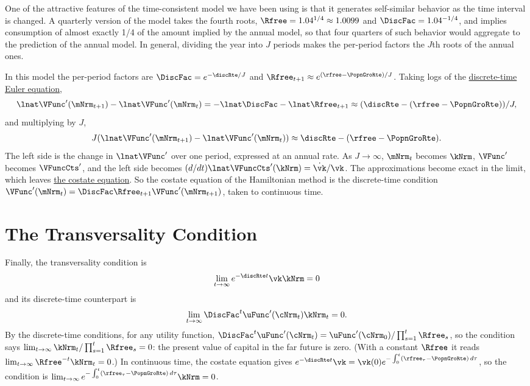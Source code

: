\documentclass{econark}
\begin{document}
One of the attractive features of the time-consistent model we have
been using is that it generates self-similar behavior as the time interval is
changed. A quarterly version of the model takes the fourth roots, $\Rfree=1.04^{1/4} \approx 1.0099$ and $\DiscFac=1.04^{-1/4}$, and implies
consumption of almost exactly 1/4 of the amount implied by the annual
model, so that four quarters of such behavior would aggregate to the
prediction of the annual model. In general, dividing the year into $J$ periods makes the per-period factors the $J$th roots of the annual ones.

In this model the per-period factors are $\DiscFac = e^{-\discRte/J}$ and $\Rfree_{t+1} \approx e^{(\rfree-\PopnGroRte)/J}$. Taking logs of the \hyperref[eq:HVD-discEuler]{discrete-time Euler equation},
\begin{equation*}
  \lnat \VFunc^{\prime}(\mNrm_{t+1}) - \lnat \VFunc^{\prime}(\mNrm_{t}) = -\lnat \DiscFac - \lnat \Rfree_{t+1} \approx (\discRte-(\rfree-\PopnGroRte))/J,
\end{equation*}
and multiplying by $J$,
\begin{equation}
  J(\lnat \VFunc^{\prime}(\mNrm_{t+1}) - \lnat \VFunc^{\prime}(\mNrm_{t})) \approx \discRte-(\rfree-\PopnGroRte) . \label{eq:vpk}
\end{equation}
The left side is the change in $\lnat \VFunc^{\prime}$ over one period, expressed at an annual rate. As $J \rightarrow \infty$, $\mNrm_{t}$ becomes $\kNrm$, $\VFunc^{\prime}$ becomes $\VFuncCts'$, and the left side becomes $(d/dt)\lnat \VFuncCts'(\kNrm) = \dot{\vk}/\vk$. The approximations become exact in the limit, which leaves \hyperref[eq:lamgrow]{the costate equation}. So the costate equation of the Hamiltonian method is the discrete-time condition $\VFunc^{\prime}(\mNrm_{t})=\DiscFac\Rfree_{t+1}\VFunc^{\prime}(\mNrm_{t+1})$, taken to continuous time.

\section{The Transversality Condition}

Finally, the transversality condition is
\begin{equation*}
  \lim_{t \rightarrow \infty} e^{-\discRte t} \vk \kNrm = 0
\end{equation*}
and its discrete-time counterpart is
\begin{equation}
  \lim_{t \rightarrow \infty} \DiscFac^{t} \uFunc^{\prime}(\cNrm_{t}) \kNrm_{t} = 0. \label{eq:HVD-discTVC}
\end{equation}
By the discrete-time conditions, for any utility function, $\DiscFac^{t}\uFunc^{\prime}(\cNrm_{t}) = \uFunc^{\prime}(\cNrm_{0})/\prod_{s=1}^{t}\Rfree_{s}$, so the condition says $\lim_{t \rightarrow \infty} \kNrm_{t}/\prod_{s=1}^{t}\Rfree_{s} = 0$: the present value of capital in the far future is zero. (With a constant $\Rfree$ it reads $\lim_{t \rightarrow \infty} \Rfree^{-t}\kNrm_{t} = 0$.) In continuous time, the costate equation gives $e^{-\discRte t}\vk = \vk(0)e^{-\int_{0}^{t}(\rfree_{\tau}-\PopnGroRte)\,d\tau}$, so the condition is $\lim_{t \rightarrow \infty} e^{-\int_{0}^{t}(\rfree_{\tau}-\PopnGroRte)\,d\tau}\kNrm = 0$.
\end{document}
